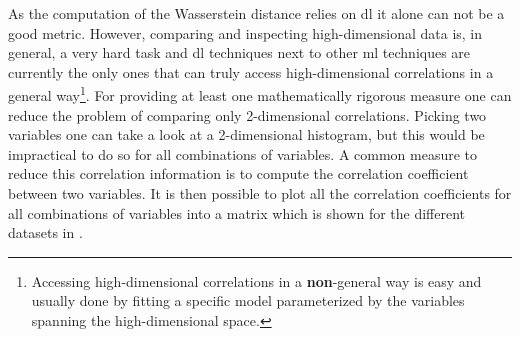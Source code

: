 
As the computation of the Wasserstein distance relies on \gls{dl} it alone can not be a good metric. However, comparing and inspecting high-dimensional data is, in general, a very hard task and \gls{dl} techniques next to other \gls{ml} techniques are currently the only ones that can truly access high-dimensional correlations in a general way\footnote{Accessing high-dimensional correlations in a \textbf{non}-general way is easy and usually done by fitting a specific model parameterized by the variables spanning the high-dimensional space.}. For providing at least one mathematically rigorous measure one can reduce the problem of comparing only 2-dimensional correlations. Picking two variables one can take a look at a 2-dimensional histogram, but this would be impractical to do so for all combinations of variables. A common measure to reduce this correlation information is to compute the correlation coefficient between two variables. It is then possible to plot all the correlation coefficients for all combinations of variables into a matrix which is shown for the different datasets in .
